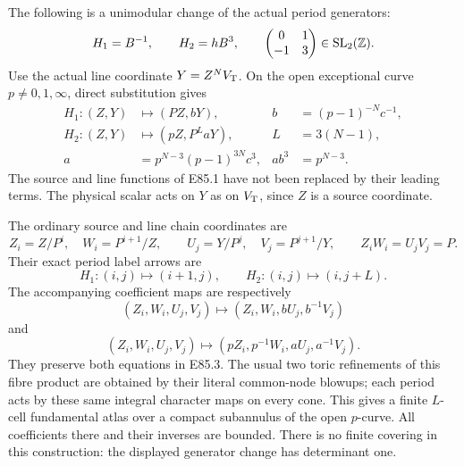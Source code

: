 The following is a unimodular change of the actual
period generators:
\[
 H_1=B^{-1},\qquad H_2=hB^3,\qquad
 \begin{pmatrix}0&1\\-1&3\end{pmatrix}\in
                {\rm SL}_2(\mathbb Z).
\]
Use the actual line coordinate \(Y=Z^NV_{\rm T}\).
On the open exceptional curve \(p\ne0,1,\infty\),
direct substitution gives
\[
\begin{aligned}
 H_1:(Z,Y)&\longmapsto(PZ,bY),&
       b&=(p-1)^{-N}c^{-1},\\
 H_2:(Z,Y)&\longmapsto(pZ,P^L aY),&
       L&=3(N-1),\\
 a&=p^{N-3}(p-1)^{3N}c^3,&
                 ab^3&=p^{N-3}.              
\end{aligned} \tag{E85.2}
\]
The source and line functions of E85.1 have not been
replaced by their leading terms. The physical scalar
acts on \(Y\) as on \(V_{\rm T}\), since \(Z\) is a
source coordinate.

The ordinary source and line chain coordinates are
\[
 Z_i=Z/P^i,\quad W_i=P^{i+1}/Z,\qquad
 U_j=Y/P^j,\quad V_j=P^{j+1}/Y,
 \qquad Z_iW_i=U_jV_j=P.                         \tag{E85.3}
\]
Their exact period label arrows are
\[
 H_1:(i,j)\longmapsto(i+1,j),\qquad
 H_2:(i,j)\longmapsto(i,j+L).
\]
The accompanying coefficient maps are respectively
\[
 (Z_i,W_i,U_j,V_j)\mapsto
           (Z_i,W_i,bU_j,b^{-1}V_j)
\]
and
\[
 (Z_i,W_i,U_j,V_j)\mapsto
           (pZ_i,p^{-1}W_i,aU_j,a^{-1}V_j).
\]
They preserve both equations in E85.3. The usual two
toric refinements of this fibre product are obtained
by their literal common-node blowups; each period
acts by these same integral character maps on every
cone. This gives a finite \(L\)-cell fundamental
atlas over a compact subannulus of the open \(p\)-curve.
All coefficients there and their inverses are bounded.
There is no finite covering in this construction:
the displayed generator change has determinant one.

